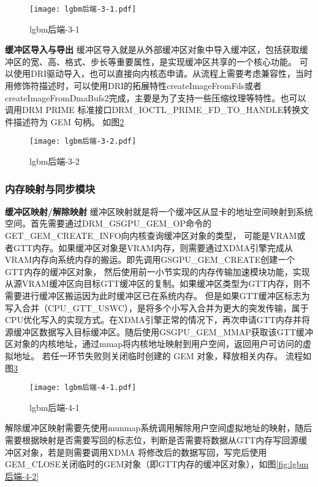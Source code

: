 \begin{figure}[H]
  \centering
  \texttt{[image: lgbm后端-3-1.pdf]}
  \caption{lgbm后端-3-1}
  \label{fig:lgbm后端-3-1}
\end{figure}  

\textbf{缓冲区导入与导出}
缓冲区导入就是从外部缓冲区对象中导入缓冲区，包括获取缓冲区的宽、高、格式、步长等重要属性，是实现缓冲区共享的一个核心功能。
可以使用DRI驱动导入，也可以直接向内核态申请。从流程上需要考虑兼容性，当时用修饰符描述时，可以使用DRI的拓展特性createImageFromFds或者
createImageFromDmaBufs2完成，主要是为了支持一些压缩纹理等特性。也可以调用​DRM PRIME 标准接口​DRM\_IOCTL\_PRIME\_FD\_TO\_HANDLE转换文件描述符为 GEM 句柄。
如图\ref{fig:lgbm后端-3-2}

\begin{figure}[H]
  \centering
  \texttt{[image: lgbm后端-3-2.pdf]}
  \caption{lgbm后端-3-2}
  \label{fig:lgbm后端-3-2}
\end{figure}  

\subsubsection{内存映射与同步模块}

\textbf{缓冲区映射/解除映射}
缓冲区映射就是将一个缓冲区从显卡的地址空间映射到系统空间。首先需要通过DRM\_GSGPU\_GEM\_OP命令的GET\_GEM\_CREATE\_INFO向内核查询缓冲区对象的类型，
可能是VRAM或者GTT内存。如果缓冲区对象是VRAM内存，则需要通过XDMA引擎完成从VRAM内存向系统内存的搬运。即先调用GSGPU\_GEM\_CREATE创建一个GTT内存的缓冲区对象，
然后使用前一小节实现的内存传输加速模块功能，实现从源VRAM缓冲区向目标GTT缓冲区的复制。如果缓冲区类型为GTT内存，则不需要进行缓冲区搬运因为此时缓冲区已在系统内存。
但是如果GTT缓冲区标志为写入合并（CPU\_GTT\_USWC），是将多个小写入合并为更大的突发传输，属于CPU优化写入的实现方式。在XDMA引擎正常的情况下，再次申请GTT内存并将
源缓冲区数据写入目标缓冲区。随后使用GSGPU\_GEM\_MMAP获取该GTT缓冲区对象的内核地址，通过mmap将内核地址映射到用户空间，返回用户可访问的虚拟地址。
若任一环节失败则关闭临时创建的 GEM 对象，释放相关内存。
流程如图\ref{fig:lgbm后端-4-1}

\begin{figure}[H]
  \centering
  \texttt{[image: lgbm后端-4-1.pdf]}
  \caption{lgbm后端-4-1}
  \label{fig:lgbm后端-4-1}
\end{figure} 

解除缓冲区映射需要先使用munmap系统调用解除用户空间虚拟地址的映射，随后需要根据映射是否需要写回的标志位，判断是否需要将数据从GTT内存写回源缓冲区对象，若是则需要调用XDMA
将修改后的数据写回，写完后使用GEM\_CLOSE关闭临时的GEM对象（即GTT内存的缓冲区对象），如图\ref{fig:lgbm后端-4-2}

